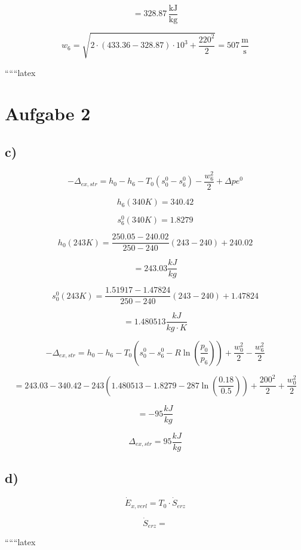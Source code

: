 \[
= 328.87 \, \frac{\text{kJ}}{\text{kg}}
\]

\[
w_6 = \sqrt{2 \cdot (433.36 - 328.87) \cdot 10^3 + \frac{220^2}{2}} = 507 \, \frac{\text{m}}{\text{s}}
\]

``````latex

\section*{Aufgabe 2}

\subsection*{c)}

\[
-\Delta_{ex,str} = h_0 - h_6 - T_0 (s_0^0 - s_6^0) - \frac{w_6^2}{2} + \Delta p e^0
\]

\[
h_6 (340 K) = 340.42
\]

\[
s_6^0 (340 K) = 1.8279
\]

\[
h_0 (243 K) = \frac{250.05 - 240.02}{250 - 240} (243 - 240) + 240.02
\]

\[
= 243.03 \frac{kJ}{kg}
\]

\[
s_0^0 (243 K) = \frac{1.51917 - 1.47824}{250 - 240} (243 - 240) + 1.47824
\]

\[
= 1.480513 \frac{kJ}{kg \cdot K}
\]

\[
-\Delta_{ex,str} = h_0 - h_6 - T_0 (s_0^0 - s_6^0 - R \ln \left( \frac{p_0}{p_6} \right) ) + \frac{w_0^2}{2} - \frac{w_6^2}{2}
\]

\[
= 243.03 - 340.42 - 243 (1.480513 - 1.8279 - 287 \ln \left( \frac{0.18}{0.5} \right) ) + \frac{200^2}{2} + \frac{w_0^2}{2}
\]

\[
= -95 \frac{kJ}{kg}
\]

\[
\Delta_{ex,str} = 95 \frac{kJ}{kg}
\]

\subsection*{d)}

\[
\dot{E}_{x,verl} = T_0 \cdot \dot{S}_{erz}
\]

\[
\dot{S}_{erz} =
\]

``````latex


